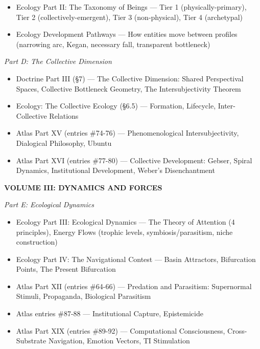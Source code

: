 \begin{itemize}[nosep,leftmargin=*]
  \item Ecology Part II: The Taxonomy of Beings — Tier 1 (physically-primary), Tier 2 (collectively-emergent), Tier 3 (non-physical), Tier 4 (archetypal)
  \item Ecology Development Pathways — How entities move between profiles (narrowing arc, Kegan, necessary fall, transparent bottleneck)
\end{itemize}


\textit{Part D: The Collective Dimension}

\begin{itemize}[nosep,leftmargin=*]
  \item Doctrine Part III (§7) — The Collective Dimension: Shared Perspectival Spaces, Collective Bottleneck Geometry, The Intersubjectivity Theorem
  \item Ecology: The Collective Ecology (§6.5) — Formation, Lifecycle, Inter-Collective Relations
  \item Atlas Part XV (entries \#74-76) — Phenomenological Intersubjectivity, Dialogical Philosophy, Ubuntu
  \item Atlas Part XVI (entries \#77-80) — Collective Development: Gebser, Spiral Dynamics, Institutional Development, Weber's Disenchantment
\end{itemize}


\bigskip\noindent\makebox[\textwidth]{\color{rulegray}\rule{5cm}{0.3pt}}\bigskip


\textbf{VOLUME III: DYNAMICS AND FORCES}


\textit{Part E: Ecological Dynamics}

\begin{itemize}[nosep,leftmargin=*]
  \item Ecology Part III: Ecological Dynamics — The Theory of Attention (4 principles), Energy Flows (trophic levels, symbiosis/parasitism, niche construction)
  \item Ecology Part IV: The Navigational Contest — Basin Attractors, Bifurcation Points, The Present Bifurcation
  \item Atlas Part XII (entries \#64-66) — Predation and Parasitism: Supernormal Stimuli, Propaganda, Biological Parasitism
  \item Atlas entries \#87-88 — Institutional Capture, Epistemicide
  \item Atlas Part XIX (entries \#89-92) — Computational Consciousness, Cross-Substrate Navigation, Emotion Vectors, TI Stimulation
\end{itemize}


